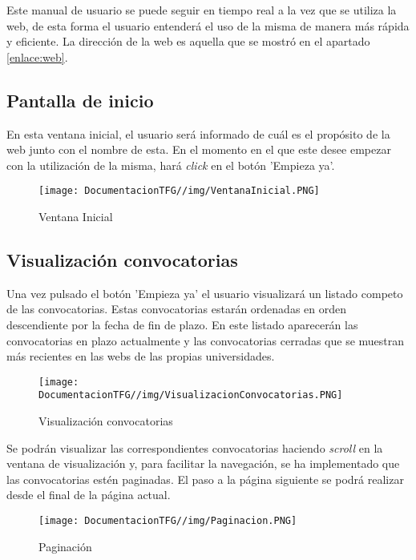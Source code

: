 Este manual de usuario se puede seguir en tiempo real a la vez que se utiliza la web, de esta forma el usuario entenderá el uso de la misma de manera más rápida y eficiente. La dirección de la web es aquella que se mostró en el apartado \ref{enlace:web}.

\subsection{Pantalla de inicio}
En esta ventana inicial, el usuario será informado de cuál es el propósito de la web junto con el nombre de esta. En el momento en el que este desee empezar con la utilización de la misma, hará \textit{click} en el botón 'Empieza ya'.
\begin{figure}[H]
    \centering
    \texttt{[image: DocumentacionTFG//img/VentanaInicial.PNG]}
    \caption{Ventana Inicial}
    \label{fig:ventana-inicial}
\end{figure}

\subsection{Visualización convocatorias}
Una vez pulsado el botón 'Empieza ya' el usuario visualizará un listado competo de las convocatorias. Estas convocatorias estarán ordenadas en orden descendiente por la fecha de fin de plazo. En este listado aparecerán las convocatorias en plazo actualmente y las convocatorias cerradas que se muestran más recientes en las webs de las propias universidades.

\begin{figure}[H]
    \centering
    \texttt{[image: DocumentacionTFG//img/VisualizacionConvocatorias.PNG]}
    \caption{Visualización convocatorias}
    \label{fig:visualizacion-convocatorias}
\end{figure}

Se podrán visualizar las correspondientes convocatorias haciendo \textit{scroll} en la ventana de visualización y, para facilitar la navegación, se ha implementado que las convocatorias estén paginadas. El paso a la página siguiente se podrá realizar desde el final de la página actual.

\begin{figure}[H]
    \centering
    \texttt{[image: DocumentacionTFG//img/Paginacion.PNG]}
    \caption{Paginación}
    \label{fig:paginacion}
\end{figure}

